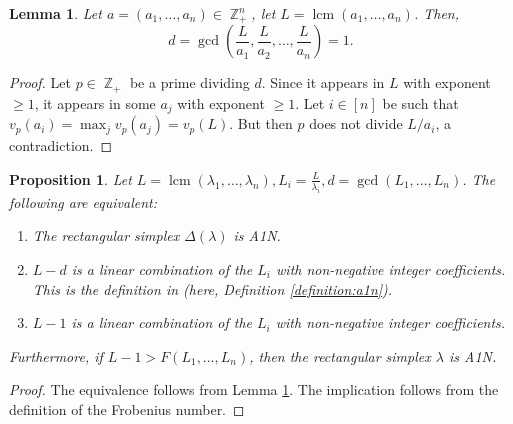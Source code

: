 \documentclass[a4paper,11pt]{amsart}
\theoremstyle{plain}
\newtheorem{lemma}[theorem]{Lemma}
\newtheorem{proposition}[theorem]{Proposition}
\theoremstyle{definition}
\theoremstyle{remark}
\DeclareMathOperator{\ZZ}{\mathbb{Z}}
\DeclareMathOperator{\lcm}{lcm}
\begin{document}
\begin{lemma}\label{lemma:d}
    Let $a = (a_1, \ldots, a_n) \in \ZZ_+^n$, let $L = \lcm(a_1, \ldots, a_n)$. Then,
    \[
    d = \gcd{ \left ( \frac{L}{a_1}, \frac{L}{a_2}, \ldots, \frac{L}{a_n} \right )} = 1.
    \]
\end{lemma}

\begin{proof}
    Let $p \in \ZZ_+$ be a prime dividing $d$. Since it appears in $L$ with exponent $\geq 1$, it appears in some $a_j$ with exponent $\geq 1$. Let $i \in [n]$ be such that $v_p(a_i) = \max_j v_p(a_j) = v_p(L)$. But then $p$ does not divide $L/a_i$, a contradiction. 
\end{proof}

\begin{proposition}\label{proposition:a1n-characterisation}
    Let $L = \lcm(\lambda_1, \ldots, \lambda_n), L_i = \frac{L}{\lambda_i}, d = \gcd(L_1, \ldots, L_n)$. The following are equivalent:
    \begin{enumerate}[1.]
        \item The rectangular simplex $\Delta(\lambda)$ is A1N.
        \item $L - d$ is a linear combination of the $L_i$ with non-negative integer coefficients. This is the definition in \cite{BrunsGubeladze:1999} (here, Definition \ref{definition:a1n}).
        \item $L - 1$ is a linear combination of the $L_i$ with non-negative integer coefficients.
    \end{enumerate}
    Furthermore, if $L - 1 > F(L_1, \ldots, L_n)$, then the rectangular simplex $\lambda$ is A1N.
\end{proposition}

\begin{proof}
    The equivalence follows from Lemma \ref{lemma:d}. The implication follows from the definition of the Frobenius number.
\end{proof}
\end{document}
